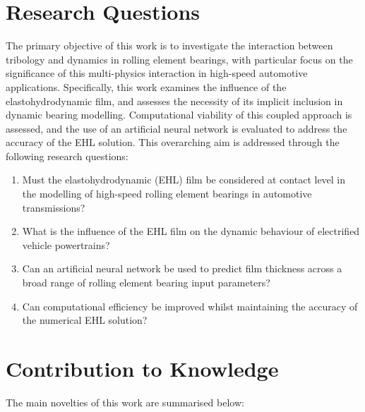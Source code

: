 \section{Research Questions} \label{Research Questions}

The primary objective of this work is to investigate the interaction between tribology and dynamics in rolling element bearings, with particular focus on the significance of this multi-physics interaction in high-speed automotive applications. Specifically, this work examines the influence of the elastohydrodynamic film, and assesses the necessity of its implicit inclusion in dynamic bearing modelling. Computational viability of this coupled approach is assessed, and the use of an artificial neural network is evaluated to address the accuracy of the EHL solution. This overarching aim is addressed through the following research questions:

\begin{enumerate}
	\item Must the elastohydrodynamic (EHL) film be considered at contact level in the modelling of high-speed rolling element bearings in automotive transmissions?
	\item What is the influence of the EHL film on the dynamic behaviour of electrified vehicle powertrains?
	\item Can an artificial neural network be used to predict film thickness across a broad range of rolling element bearing input parameters?
	\item Can computational efficiency be improved whilst maintaining the accuracy of the numerical EHL solution?

\end{enumerate}

\section{Contribution to Knowledge} \label{Contribution to Knowledge}

The main novelties of this work are summarised below:

